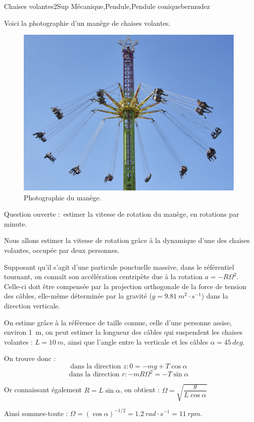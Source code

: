 
\begin{exercise}{Chaises volantes}{2}{Sup}
{Mécanique,Pendule,Pendule conique}{bermudez}

Voici la photographie d'un manège de chaises volantes.

\begin{figure}[H]
    \centering
    \includegraphics[width=\linewidth]{meca/mecapoint/chaises_volantes.png}
    \caption{Photographie du manège.}
    \label{fig:my_label}
\end{figure}

\textsf{Question ouverte :}~estimer la vitesse de rotation du manège, en rotations par minute.

\end{exercise}

\begin{solution}

Nous allons estimer la vitesse de rotation grâce à la dynamique d'une des chaises volantes, occupée par deux personnes.

Supposant qu'il s'agit d'une particule ponctuelle massive, dans le référentiel tournant, on connaît son accélération centripète due à la rotation $a = -R\Omega^2$. Celle-ci doit être compensée par la projection orthogonale de la force de tension des câbles, elle-même déterminée par la gravité ($g = \SI{9,81}{m^2\cdot s^{-1}}$) dans la direction verticale.

On estime grâce à la référence de taille connue, celle d'une personne assise, environ \SI{1}{m}, on peut estimer la longueur des câbles qui suspendent les chaises volantes : $L = \SI{10}{m}$, ainsi que l'angle entre la verticale et les câbles $\alpha = \SI{45}{deg}$.

On trouve donc :
$$\text{dans la direction $z$} : 0 = -mg + T\cos{\alpha}$$
$$\text{dans la direction $r$} : -mR\Omega^2 = -T\sin{\alpha}$$

Or connaissant également $R = L\sin\alpha$, on obtient :
$\Omega = \sqrt{\dfrac{g}{L\cos\alpha}}$

Ainsi sommes-toute : $\Omega = (\cos\alpha)^{-1/2} = \SI{1.2}{rad\cdot s^{-1}} = \SI{11}{rpm}$.

\end{solution}